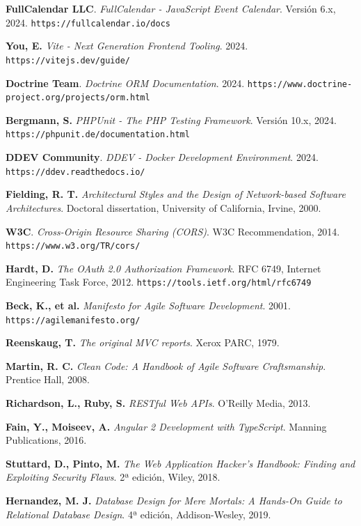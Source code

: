 \documentclass[12pt,a4paper,oneside]{report}
\begin{document}
\noindent
[7] \textbf{FullCalendar LLC}. \textit{FullCalendar - JavaScript Event Calendar}. Versión 6.x, 2024. \texttt{https://fullcalendar.io/docs}

\noindent
[8] \textbf{You, E.} \textit{Vite - Next Generation Frontend Tooling}. 2024. \texttt{https://vitejs.dev/guide/}

\noindent
[9] \textbf{Doctrine Team}. \textit{Doctrine ORM Documentation}. 2024. \texttt{https://www.doctrine-project.org/projects/orm.html}

\noindent
[10] \textbf{Bergmann, S.} \textit{PHPUnit - The PHP Testing Framework}. Versión 10.x, 2024. \texttt{https://phpunit.de/documentation.html}

\noindent
[11] \textbf{DDEV Community}. \textit{DDEV - Docker Development Environment}. 2024. \texttt{https://ddev.readthedocs.io/}

\noindent
[12] \textbf{Fielding, R. T.} \textit{Architectural Styles and the Design of Network-based Software Architectures}. Doctoral dissertation, University of California, Irvine, 2000.

\noindent
[13] \textbf{W3C}. \textit{Cross-Origin Resource Sharing (CORS)}. W3C Recommendation, 2014. \texttt{https://www.w3.org/TR/cors/}

\noindent
[14] \textbf{Hardt, D.} \textit{The OAuth 2.0 Authorization Framework}. RFC 6749, Internet Engineering Task Force, 2012. \texttt{https://tools.ietf.org/html/rfc6749}

\noindent
[15] \textbf{Beck, K., et al.} \textit{Manifesto for Agile Software Development}. 2001. \texttt{https://agilemanifesto.org/}

\noindent
[16] \textbf{Reenskaug, T.} \textit{The original MVC reports}. Xerox PARC, 1979.

\noindent
[17] \textbf{Martin, R. C.} \textit{Clean Code: A Handbook of Agile Software Craftsmanship}. Prentice Hall, 2008.

\noindent
[18] \textbf{Richardson, L., Ruby, S.} \textit{RESTful Web APIs}. O'Reilly Media, 2013.

\noindent
[19] \textbf{Fain, Y., Moiseev, A.} \textit{Angular 2 Development with TypeScript}. Manning Publications, 2016.

\noindent
[20] \textbf{Stuttard, D., Pinto, M.} \textit{The Web Application Hacker's Handbook: Finding and Exploiting Security Flaws}. 2ª edición, Wiley, 2018.

\noindent
[21] \textbf{Hernandez, M. J.} \textit{Database Design for Mere Mortals: A Hands-On Guide to Relational Database Design}. 4ª edición, Addison-Wesley, 2019.
\end{document}
